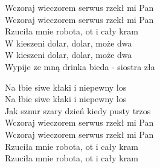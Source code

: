 \begin{text}
    Wczoraj wieczorem serwus rzekł mi Pan\\
    Wczoraj wieczorem serwus rzekł mi Pan\\
    Rzuciła mnie robota, ot i cały kram\\
    W kieszeni dolar, dolar, może dwa\\
    W kieszeni dolar, dolar, może dwa\\
    Wypije ze mną drinka bieda - siostra zła

    Na łbie siwe kłaki i niepewny los\\
    Na łbie siwe kłaki i niepewny los\\
    Jak sznur szary dzień kiedy pusty trzos\\
    Wczoraj wieczorem serwus rzekł mi Pan\\
    Wczoraj wieczorem serwus rzekł mi Pan\\
    Rzuciła mnie robota, ot i cały kram\\
    Rzuciła mnie robota, ot i cały kram
\end{text}
\begin{chord}

\end{chord}